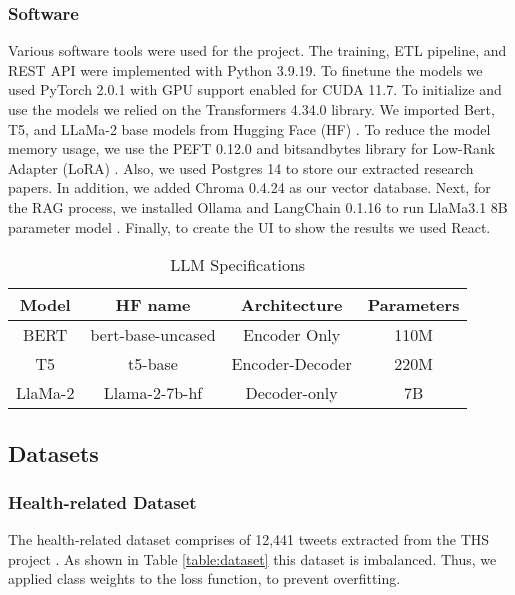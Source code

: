 \subsubsection{Software}
Various software tools were used for the project. The training, ETL pipeline, and REST API were implemented with Python 3.9.19. To finetune the models we used PyTorch 2.0.1 with GPU support enabled for
CUDA 11.7. To initialize and use the models we relied on  the Transformers 4.34.0 library. We imported Bert, T5, and LLaMa-2 base models from Hugging Face (HF) \cite{huggingface}. To reduce the model memory usage, we use the PEFT 0.12.0 and bitsandbytes library for Low-Rank Adapter (LoRA) \cite{hu2021loralowrankadaptationlarge}. Also, we used Postgres 14 to store our extracted research papers. In addition, we added Chroma 0.4.24 as our vector database. Next, for the RAG process, we installed Ollama \cite{ollama} and LangChain 0.1.16 to run LlaMa3.1 8B parameter model \cite{touvron2023llamaopenefficientfoundation}. Finally, to create the UI to show the results we used React.

  \begin{table}[htbp]
\centering
\caption{LLM Specifications}
{\scriptsize
\begin{tabular}{||c | c | c | c||} 
 \hline
\textbf{Model} & \textbf{HF name} & \textbf{Architecture} & \textbf{Parameters} \\
 \hline
 BERT & bert-base-uncased & Encoder Only & 110M \\ 
 \hline
 T5 & t5-base & Encoder-Decoder & 220M \\
 \hline
 LlaMa-2 & Llama-2-7b-hf & Decoder-only & 7B \\
 \hline
\end{tabular}
}
\label{table:LLM}
\end{table}

\subsection{Datasets}

\subsubsection{Health-related Dataset}
The health-related dataset comprises of 12,441 tweets extracted from the THS project \cite{8622504}. As shown in Table \ref{table:dataset} this dataset is imbalanced. Thus, we applied class weights to the loss function, to prevent overfitting.


